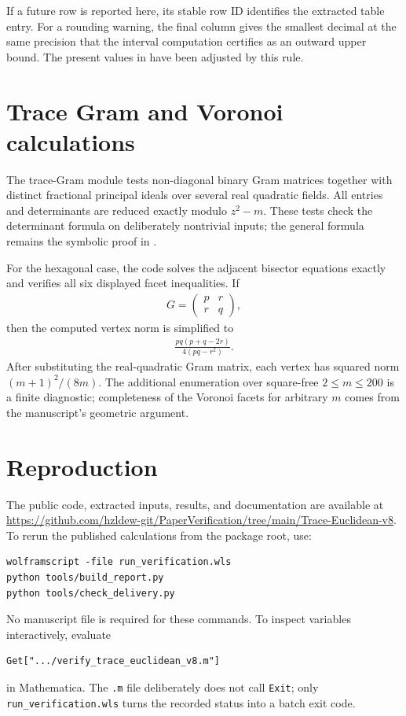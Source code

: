 \documentclass[12pt,a4paper]{amsart}
\theoremstyle{remark}
\theoremstyle{definition}
\begin{document}


If a future row is reported here, its stable row ID identifies the extracted
table entry.  For a rounding warning, the final column gives the smallest
decimal at the same precision that the interval computation certifies as an
outward upper bound.  The present values in 
have been adjusted by this rule.

\section{Trace Gram and Voronoi calculations}

The trace-Gram module tests non-diagonal binary Gram matrices together with
distinct fractional principal ideals over several real quadratic fields.  All
entries and determinants are reduced exactly modulo \(z^{2}-m\).  These tests
check the determinant formula on deliberately nontrivial inputs; the general
formula remains the symbolic proof in .

For the hexagonal case, the code solves the adjacent bisector equations exactly
and verifies all six displayed facet inequalities.  If
\begin{align*}
G=\begin{pmatrix}p&r\\r&q\end{pmatrix},
\end{align*}
then the computed vertex norm is simplified to
\begin{align*}
\frac{pq(p+q-2r)}{4(pq-r^{2})}.
\end{align*}
After substituting the real-quadratic Gram matrix, each vertex has squared norm
\((m+1)^{2}/(8m)\).  The additional enumeration over square-free
\(2\le m\le200\) is a finite diagnostic; completeness of the Voronoi facets
for arbitrary \(m\) comes from the manuscript's geometric argument.

\section{Reproduction}

The public code, extracted inputs, results, and documentation are available at
\url{https://github.com/hzldew-git/PaperVerification/tree/main/Trace-Euclidean-v8}.
To rerun the published calculations from the package root, use:
\begin{Verbatim}[fontsize=\small,breaklines=true]
wolframscript -file run_verification.wls
python tools/build_report.py
python tools/check_delivery.py
\end{Verbatim}
No manuscript file is required for these commands.  To inspect variables
interactively, evaluate
\begin{Verbatim}[fontsize=\small,breaklines=true]
Get[".../verify_trace_euclidean_v8.m"]
\end{Verbatim}
in Mathematica.  The \texttt{.m} file deliberately does not call
\texttt{Exit}; only \texttt{run\_verification.wls} turns the recorded
status into a batch exit code.
\end{document}
